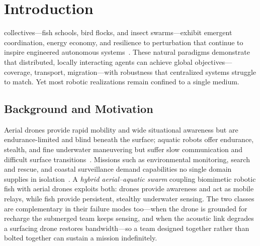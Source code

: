 \documentclass[journal]{IEEEtran}
\begin{document}
\section{Introduction}
 collectives---fish schools, bird flocks, and
insect swarms---exhibit emergent coordination, energy economy, and resilience
to perturbation that continue to inspire engineered autonomous
systems~\cite{reynolds1987flocks,katz2011inferring}. These natural paradigms
demonstrate that distributed, locally interacting agents can achieve global
objectives---coverage, transport, migration---with robustness that centralized
systems struggle to match. Yet most robotic realizations remain confined to a
single medium.

\subsection{Background and Motivation}
Aerial drones provide rapid mobility and wide situational awareness but are
endurance-limited and blind beneath the surface; aquatic robots offer endurance,
stealth, and fine underwater maneuvering but suffer slow communication and
difficult surface transitions~\cite{berlinger2021implicit,tahir2024aerial,qi2025review}.
Missions such as environmental monitoring, search and rescue, and coastal
surveillance demand capabilities no single domain supplies in
isolation~\cite{quattrini2022multirobot}. A \emph{hybrid aerial--aquatic swarm}
coupling biomimetic robotic fish with aerial drones exploits both: drones provide
awareness and act as mobile relays, while fish provide persistent, stealthy
underwater sensing. The two classes are complementary in their failure modes
too---when the drone is grounded for recharge the submerged team keeps sensing,
and when the acoustic link degrades a surfacing drone restores bandwidth---so a
team designed together rather than bolted together can sustain a mission
indefinitely.
\end{document}
